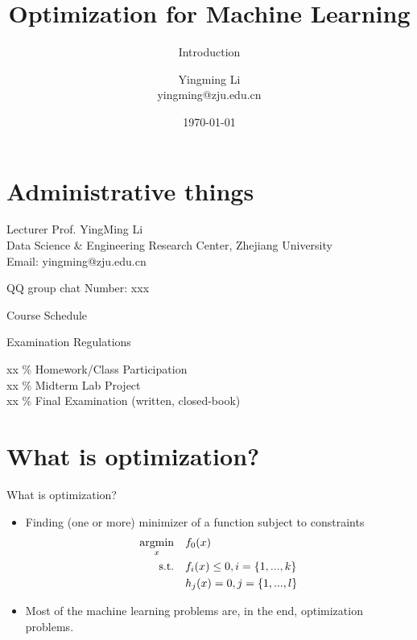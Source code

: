\documentclass[draft]{beamer}
\title[Opt for ML]{Optimization for Machine Learning}
\subtitle{Introduction}
\author[YingmingLi]{Yingming Li \\ \textrm{yingming@zju.edu.cn} }
\institute[DSERC, ZJU]{Data Science \& Engineering Research Center, ZJU}
\date[\today]{\today}
\begin{document}
\begin{frame}
  \titlepage
\end{frame}



\section{Administrative things} 

\begin{frame}
	\begin{block}{Lecturer}
		Prof. YingMing Li  \\ 
		Data Science \& Engineering Research Center, Zhejiang University \\  
		Email: \textrm{yingming@zju.edu.cn} 
	\end{block} 
	\begin{block}{QQ group chat} 
		Number: xxx
	\end{block}
\end{frame}

\begin{frame}{Course Schedule} 
\end{frame}

\begin{frame}
	{Examination Regulations} 

	xx \% Homework/Class Participation \\ 
	xx \% Midterm Lab Project \\ 
	xx \% Final Examination (written, closed-book)  
\end{frame}

\section{What is optimization?} 

\begin{frame}{What is optimization?}
	\begin{itemize}
		\item<1-> Finding (one or more)  minimizer of a function subject to constraints 
			\begin{equation}
			\begin{aligned}
				\mathop{\mathrm{argmin}}_x \quad & f_0(x)  \\ 
				\textrm{s.t.} \quad & f_i(x) \le 0, i = \{1,...,k\} \\  
				 		\quad & h_j(x) = 0, j = \{1,...,l\} \\ 
			\end{aligned}
			\end{equation}
		\item<2-> Most of the machine learning problems are, in the end, optimization problems. 
	\end{itemize}
\end{frame}	
\end{document}
